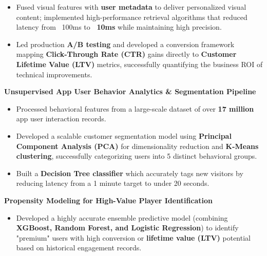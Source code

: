 \begin{cventries}
{\begin{cvitems}
\begin{itemize}
{            building an end-to-end data pipeline and utilizing \textbf{ViT} to extract robust feature embeddings.
          }
          \item {
            Fused visual features with \textbf{user metadata} to deliver personalized visual content; 
            implemented high-performance retrieval algorithms that reduced latency from ~100ms 
            to \textbf{~10ms} while maintaining high precision.
          }
          \item {
            Led production \textbf{A/B testing} and developed a conversion framework mapping 
            \textbf{Click-Through Rate (CTR)} gains directly to \textbf{Customer Lifetime Value (LTV)} metrics, 
            successfully quantifying the business ROI of technical improvements.
          }
        \end{itemize}
      \vspace{0.5mm}
      \item {\textbf{Unsupervised App User Behavior Analytics \& Segmentation Pipeline}}
        \begin{itemize}
          \item {
            Processed behavioral features from a large-scale dataset of 
            over \textbf{17 million} app user interaction records.
          }
          \item {
            Developed a scalable customer segmentation model using \textbf{Principal Component Analysis (PCA)} 
            for dimensionality reduction and \textbf{K-Means clustering}, 
            successfully categorizing users into 5 distinct behavioral groups.
          }
          \item {
            Built a \textbf{Decision Tree classifier} which 
            accurately tags new visitors by reducing latency from a 1 minute target to 
            under 20 seconds.
          }
        \end{itemize}
      \vspace{0.5mm}
      \item {\textbf{Propensity Modeling for High-Value Player Identification}}
        \begin{itemize}
          \item {
            Developed a highly accurate ensemble predictive model 
            (combining \textbf{XGBoost, Random Forest, and Logistic Regression}) 
            to identify "premium" users with high conversion or \textbf{lifetime value (LTV)} 
            potential based on historical engagement records.
          }

\end{itemize}
\end{cvitems}}
\end{cventries}
